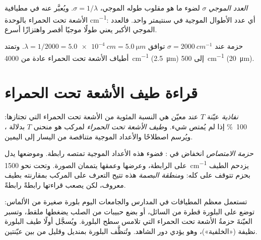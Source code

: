 \begin{definition}\label{def:g11:infrared:wavenumber}
\emph{العدد الموجي} $\sigma$ لضوء ما هو مقلوب طوله الموجي،
$\sigma = 1/\lambda$. ويُعبَّر عنه في مطيافية الأشعة تحت الحمراء بالوحدة
\si{cm^{-1}}: أي عدد الأطوال الموجية في سنتيمتر واحد. فالعدد الموجي الأكبر يعني
طولًا موجيًا أقصر واهتزازًا أسرع.
\end{definition}

\begin{example}\label{ex:g11:infrared:convert}
حزمة عند $\sigma = \qty{2000}{cm^{-1}}$ توافق
$\lambda = 1/2000 = \qty{5.0e-4}{cm} = \qty{5.0}{\micro m}$. وتمتد أطياف
الأشعة تحت الحمراء عادة من \qty{4000}{cm^{-1}} (\qty{2.5}{\micro m}) إلى
\qty{500}{cm^{-1}} (\qty{20}{\micro m}).
\end{example}

\section{قراءة طيف الأشعة تحت الحمراء}

\begin{definition}\label{def:g11:infrared:spectrum}
\emph{نفاذية} عيّنة $T$ عند  معيّن هي النسبة المئوية
من الأشعة تحت الحمراء التي تجتازها: \qty{100}{\percent} إذا لم يُمتص شيء.
و\emph{طيف الأشعة تحت الحمراء} لمركب هو منحنى
$T$ بدلالة ، ويُرسم اصطلاحًا والأعداد الموجية متناقصة من اليسار
إلى اليمين.
\end{definition}

\begin{definition}\label{def:g11:infrared:band}
\emph{حزمة الامتصاص} انخفاض في : فضوء هذه الأعداد
الموجية تمتصه رابطة. وموضعها يدل على الرابطة، وعرضها وعمقها يتممان الصورة.
وتحت نحو \qty{1500}{cm^{-1}} يزدحم الطيف بحزم تتوقف على  كله: و\emph{منطقة
البصمة} هذه تتيح التعرف على المركب بمقارنته بطيف معروف،
لكن يصعب قراءتها رابطةً رابطةً.
\end{definition}

\begin{inthelab}
تستعمل معظم المطيافات في المدارس والجامعات اليوم بلورة صغيرة من الألماس: توضع
على البلورة قطرة من السائل، أو بضع حبيبات من الصلب يضغطها ملقط، وتسبر العيّنةَ
حزمةُ الأشعة تحت الحمراء التي تلامس سطح البلورة. ويُسجَّل أولًا طيف البلورة
نظيفة («الخلفية»)، وهو يؤدي دور الشاهد. وتُنظَّف البلورة بمنديل وقليل من 
بين عيّنتين.
\end{inthelab}

